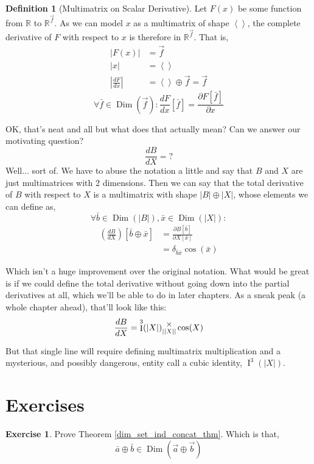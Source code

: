 \documentclass[12pt]{book}
\theoremstyle{plain}
\theoremstyle{definition}
\newtheorem{definition}{Definition}[chapter]
\newtheorem{exercise}{Exercise}[chapter]
\theoremstyle{ppart}
\theoremstyle{case}
\theoremstyle{solution}
\DeclareMathOperator{\Dim}{Dim}
\DeclareMathOperator{\Ident}{I}
\newcommand{\mmult}[1]{\text{\raisebox{1ex}{$\underset{#1}{\times}$}}}
\newcommand{\shape}[1]{\left|#1\right|}
\begin{document}
\begin{definition}[Multimatrix on Scalar Derivative]
\label{ms_derivative}
Let $F(x)$ be some function from $\mathbb{R}$ to $\mathbb{R}^{\vec{f}}$.
As we can model $x$ as a multimatrix of shape $\left<\right>$,
the complete derivative of $F$ with respect to $x$ is therefore in
$\mathbb{R}^{\vec{f}}$. That is,
\begin{align*}
\shape{F(x)} &= \vec{f} \\
\shape{x} &= \left<\right> \\
\shape{\frac{dF}{dx}} &= \left<\right> \oplus \vec{f} = \vec{f}
\end{align*}
\[
\forall \bar{f} \in \Dim(\vec{f}):
        \frac{dF}{dx}[\bar{f}] =
        \frac{\partial F[\bar{f}]}{\partial x}
\]
\end{definition}

OK, that's neat and all but what does that actually mean? Can we answer our motivating 
question?
\[\frac{dB}{dX} = ? \]
Well... sort of. We have to abuse the notation a little and say that $B$ and $X$ are
just multimatrices with 2 dimensions. Then we can say that the total derivative
of $B$ with respect to $X$ is a multimatrix with shape $\shape{B} \oplus \shape{X}$,
whose elements we can define as,
\[\forall \bar{b} \in \Dim(\shape{B}), \bar{x} \in \Dim(\shape{X}):\]
\begin{align*}
\left( \frac{dB}{dX} \right)[\bar{b} \oplus \bar{x}]
&= \frac{\partial B[\bar{b}]}{\partial X[\bar{x}]} \\
&= \delta_{\bar{b}\bar{x}}\cos(\bar{x})
\end{align*}

Which isn't a huge improvement over the original notation. What would be great is
if we could define the total derivative without going down into the partial derivatives
at all, which we'll be able to do in later chapters. As a sneak peak (a whole
chapter ahead), that'll look like this:
\[
\frac{dB}{dX} = \Ident^3(\shape{X}) \mmult{\shape{\shape{X}}} \cos(X)
\]

But that single line will require defining multimatrix multiplication and
a mysterious, and possibly dangerous, entity call a cubic identity, $\Ident^3(\shape{X})$.

\section{Exercises}

\begin{exercise}
\label{dim_set_ind_concat_ex}
Prove Theorem \ref{dim_set_ind_concat_thm}. Which is that,
\[ \bar{a} \oplus \bar{b} \in \Dim(\vec{a} \oplus \vec{b}) \]
\end{exercise}
\end{document}
